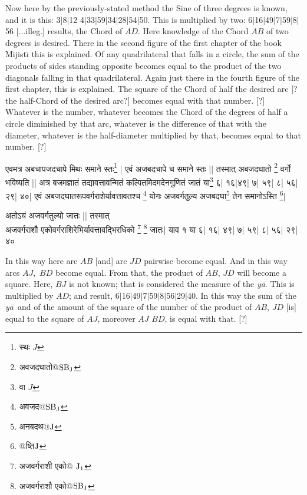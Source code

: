 \documentclass[11pt,a5paper]{book}
\def\elp{$\ldots\,$}
\def\ya{\textit{y\=a}}
\def\elp{$\ldots$}
\def\danda{$|$}
\begin{document}
Now here by the previously-stated method the Sine of three degrees is known, and it 
is this: 3\danda 8\danda 12 4\danda 33\danda 59\danda 34\danda 28\danda 54\danda 50.
This is multiplied by two: 6\danda 16\danda 49\danda 7\danda 59\danda 8\danda 56
[\elp illeg.] results, the Chord of $AD$. Here knowledge of the Chord $AB$ of two degrees
is desired. There in the second figure of the first chapter of the book Mijist\={\i} this
is explained. Of any quadrilateral that falls in a circle, the
sum of the products of sides standing opposite 
becomes equal to the product of the two diagonals falling in that quadrilateral.
Again just there in the fourth figure of the first chapter, this is explained. The square
of the Chord of half the desired arc [? the half-Chord of the desired
arc?] becomes equal with that number. [?] Whatever is the number, whatever becomes
the Chord of the degrees of half a circle diminished by that arc, whatever is the difference 
of that with the diameter, whatever is the half-diameter multiplied by that, becomes 
equal to that number. [?] 

\newpage
{\s एवमत्र अबचापजदचापे मिथः समाने स्तः\footnote{{\s स्थः} $J$} |
एवं अजबदचापे च समाने स्तः ||
तस्मात् अबजदघातो \footnote{{\s अवजदघातो@}${\rm SB_J}$} वर्गो भविष्यति ||
अत्र बजमज्ञातं तद्यावत्तावन्मितं कल्पितमिदमदेनगुणितं
जातं या\footnote{{\s वा} $J$} ६| १६|४९| ७| ५९| ८| ५६| २९| ४०|
एवं अबजदघातरूपवर्गराशेर्यावत्तावतश्च \footnote{{\s अवजद@}${\rm SB_J}$} योगः
अजवर्गतुल्य अजबदघा\footnote{{\s अनबदथ@}${\rm J}$} तेन समानोऽस्ति \footnote{{\s @ष्ति}${\rm J}$}|

अतोऽयं अजवर्गतुल्यो जातः ||
तस्मात् \\
अजवर्गराशौ एकोवर्गराशिरेभिर्यावत्तावद्भिरधिको
\footnote{{\s अजवर्गराशी एको@ }${\rm J_1}$}
\footnote{{\s अजवर्गराशौ एको@}${\rm SB_J}$}
जातः|
याव १ या ६| १६| ४९| ७| ५९| ८| ५६| २९| ४०}


\newpage
In this way here arc $AB$ [and] arc $JD$ pairwise become equal. 
And in this way arcs $AJ,$  $BD$ become equal.
From that, the product of $AB$, $JD$ will become a square. Here, $BJ$ is not known;
that is considered the measure of the \ya. This is multiplied by $AD$; and result,
6\danda 16\danda 49\danda 7\danda 59\danda 8\danda 56\danda 29\danda 40.
In this way the sum of the \ya\
and of the amount of the square of the number of the product of $AB$, $JD$
[is] equal to the square of $AJ$, moreover $AJ$ $BD$, is equal with that. [?]

\end{document}
